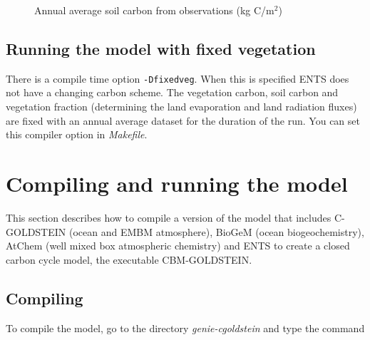 \documentclass[10pt,a4paper]{report}
\begin{document}
\begin{figure}
\centerline{}
\caption{Annual average soil carbon from observations (kg
C/m$^{2}$)}\label{soilobs}
\end{figure}

\section{Running the model with fixed vegetation}
There is a compile time option {\tt -Dfixedveg}. When this is
specified ENTS does not have a changing carbon scheme. The
vegetation carbon, soil carbon and vegetation fraction (determining
the land evaporation and land radiation fluxes) are fixed with an
annual average dataset for the duration of the run. You can set this
compiler option in {\em Makefile}.

\chapter{Compiling and running the model}

This section describes how to compile a version of the model that
includes C-GOLDSTEIN (ocean and EMBM atmosphere), BioGeM (ocean
biogeochemistry), AtChem (well mixed box atmospheric chemistry) and
ENTS to create a closed carbon cycle model, the executable
CBM-GOLDSTEIN.

\section{Compiling}

To compile the model, go to the directory {\em genie-cgoldstein}
and type the command
\end{document}
